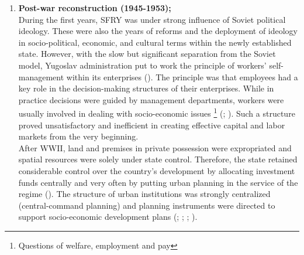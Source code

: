 \documentclass[11pt]{report}
\begin{document}
{{{{\begin{enumerate}
\item  \textbf{Post-war reconstruction (1945-1953);}
\\
During the first years, SFRY was under strong influence of Soviet political ideology. These were also the years of reforms and the deployment of ideology in socio-political, economic, and cultural terms within the newly established state. However, with the slow but significant separation from the Soviet model, Yugoslav administration put to work the principle of workers’ self-management within its enterprises (\href{Zec}{\citealt{zec_economic_2012}}). The principle was that employees had a key role in the decision-making structures of their enterprises. While in practice decisions were guided by management departments, workers were usually involved in dealing with socio-economic issues
\footnote{Questions of welfare, employment and pay}
(\href{Lydall}{\citealt{lydall_yugoslav_1986}}; \href{Estrin}{\citealt{estrin_yugoslavia:_1991}}).
Such a structure proved unsatisfactory and inefficient in creating effective capital and labor markets from the very beginning.
\\

After WWII, land and premises in private possession were expropriated and spatial resources were solely under state control. Therefore, the state retained considerable control over the country’s development by allocating investment funds centrally and very often by putting urban planning in the service of the regime  (\href{Estrin}{\citealt{estrin_yugoslavia:_1991}}). The structure of urban institutions was strongly centralized (central-command planning) and planning instruments were directed to support socio-economic development plans (\href{Borovnica}{\citealt{borovnica_osvrt_1980}}; \href{Pajovic}{\citealt{pajovic_pregled_2005}}; \href{Nedovic}{\citealt{nedovic-budic_mornings_2011}}; \href{Peric}{\citealt{peric_evolution_2016}}). 


\end{enumerate}}}}}
\end{document}
